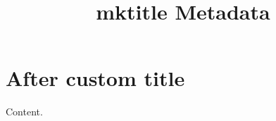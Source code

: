 \documentclass[titlepage=simple]{SUSTechHomework}
\title{mktitle Metadata}
\begin{document}
\mktitle
\section{After custom title}
Content.
\end{document}
